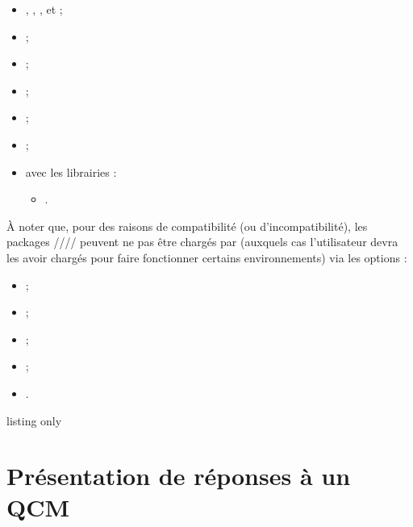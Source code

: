 \documentclass[french,11pt,a4paper]{article}
\begin{document}
\begin{itemize}
	\item {}, , ,  et  ;
	\item {} ;
	\item {} ;
	\item {} ;
	\item {} ;
	\item {} ;
	\item {} avec les librairies :
	\begin{itemize}
		\item {}.
	\end{itemize}
\end{itemize}

À noter que, pour des raisons de compatibilité (ou d'incompatibilité), les packages //// peuvent ne pas être chargés par  (auxquels cas l'utilisateur devra les avoir chargés pour faire fonctionner certains environnements) via les options :

\begin{itemize}
	\item {} ;
	\item {} ;
	\item {} ;
	\item {} ;
	\item {}.
\end{itemize}

\begin{DemoCode}{listing only}
\usepackage{customenvs}

\usepackage[option(s)]{customenvs}
\end{DemoCode}

\newpage

\section{Présentation de réponses à un QCM}
\end{document}

